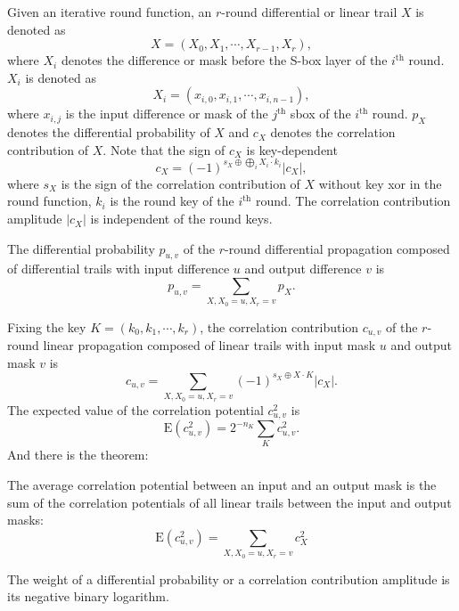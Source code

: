 Given an iterative round function, an $r$-round differential or linear trail $X$ is denoted as
\[
    X=(X_0, X_1,\cdots, X_{r-1}, X_r),
\]
where $X_i$ denotes the difference or mask before the S-box layer of the $i^{\text{th}}$ round. $X_i$ is denoted as
\[
    X_i=(x_{i,0},x_{i,1},\cdots,x_{i,n-1}),
\]
where $x_{i,j}$ is the input difference or mask of the $j^{\text{th}}$ sbox of the $i^{\text{th}}$ round. $p_X$ denotes the differential probability of $X$ and $c_X$ denotes the correlation contribution of $X$. Note that the sign of $c_X$ is key-dependent
\[
    c_X=(-1)^{s_X\oplus \bigoplus_i X_i\cdot k_i}|c_X|,
\]
where $s_X$ is the sign of the correlation contribution of $X$ without key xor in the round function, $k_i$ is the round key of the $i^{\text{th}}$ round. The correlation contribution amplitude $|c_X|$ is independent of the round keys. 

The differential probability $p_{u,v}$ of the $r$-round differential propagation composed of differential trails with input difference $u$ and output difference $v$ is
\[
    p_{u,v}=\sum\limits_{X,X_0=u,X_r=v}p_X.
\]

Fixing the key $K=(k_0,k_1,\cdots,k_r)$, the correlation contribution $c_{u,v}$ of the $r$-round linear propagation composed of linear trails with input mask $u$ and output mask $v$ is
\[
    c_{u,v}=\sum\limits_{X,X_0=u,X_r=v}(-1)^{s_X\oplus X\cdot K}|c_X|. 
\]
The expected value of the correlation potential $c_{u,v}^2$ is
\[
    \text{E}(c_{u,v}^2)=2^{-n_K}\sum\limits_K c_{u,v}^2.
\]
And there is the theorem: 
\begin{theorem}[\cite{DR01}]
    The average correlation potential between an input and an output mask is the sum of the correlation potentials of all linear trails between the input and output masks:
    \[
        \text{E}(c_{u,v}^2)=\sum\limits_{X,X_0=u,X_r=v} c_X^2
    \]
\end{theorem}

The weight of a differential probability or a correlation contribution amplitude is its negative binary logarithm. 